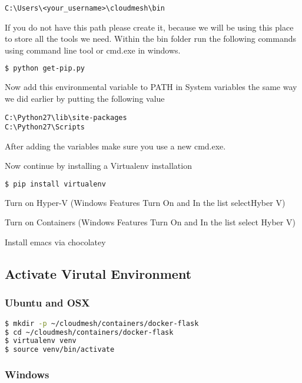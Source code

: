 \begin{lstlisting}
C:\Users\<your_username>\cloudmesh\bin
\end{lstlisting}

If you do not have this path please create it, because we will be using
this place to store all the tools we need. Within the bin folder run the
following commands using command line tool or cmd.exe in windows.

\begin{lstlisting}[language=bash]
$ python get-pip.py
\end{lstlisting}

Now add this environmental variable to PATH in System variables the same
way we did earlier by putting the following value

\begin{lstlisting}
C:\Python27\lib\site-packages
C:\Python27\Scripts
\end{lstlisting}

After adding the variables make sure you use a new cmd.exe.

Now continue by installing a Virtualenv installation

\begin{lstlisting}[language=bash]
$ pip install virtualenv 
\end{lstlisting}

Turn on Hyper-V (Windows Features Turn On and In the list selectHyber V)

Turn on Containers (Windows Features Turn On and In the list select
Hyber V)

Install emacs via chocolatey

\subsection{Activate Virutal Environment}

\subsubsection{Ubuntu and OSX}

\begin{lstlisting}[language=bash]
$ mkdir -p ~/cloudmesh/containers/docker-flask
$ cd ~/cloudmesh/containers/docker-flask
$ virtualenv venv
$ source venv/bin/activate
\end{lstlisting}

\subsubsection{Windows}

